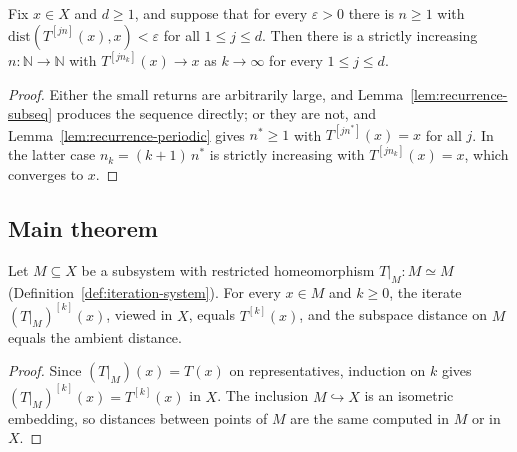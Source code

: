 \begin{lemma}
    \label{lem:recurrence-sequential}
    \leanok
    Fix $x \in X$ and $d \ge 1$, and suppose that for every $\varepsilon > 0$
    there is $n \ge 1$ with $\mathrm{dist}(T^{[j n]}(x), x) < \varepsilon$ for all
    $1 \le j \le d$. Then there is a strictly increasing
    $n : \mathbb{N} \to \mathbb{N}$ with $T^{[j n_k]}(x) \to x$ as $k \to \infty$
    for every $1 \le j \le d$.
\end{lemma}
\begin{proof}
    Either the small returns are arbitrarily large, and
    Lemma~\ref{lem:recurrence-subseq} produces the sequence directly; or they are
    not, and Lemma~\ref{lem:recurrence-periodic} gives $n^\ast \ge 1$ with
    $T^{[j n^\ast]}(x) = x$ for all $j$. In the latter case
    $n_k = (k+1)\, n^\ast$ is strictly increasing with $T^{[j n_k]}(x) = x$,
    which converges to $x$.
\end{proof}

\subsection{Main theorem}

\begin{lemma}
    \label{lem:restricted-iterate-agreement}
    \leanok
    Let $M \subseteq X$ be a subsystem with restricted homeomorphism
    $T|_M : M \simeq M$ (Definition~\ref{def:iteration-system}). For every
    $x \in M$ and $k \ge 0$, the iterate $(T|_M)^{[k]}(x)$, viewed in $X$, equals
    $T^{[k]}(x)$, and the subspace distance on $M$ equals the ambient distance.
\end{lemma}
\begin{proof}
    Since $(T|_M)(x) = T(x)$ on representatives, induction on $k$ gives
    $(T|_M)^{[k]}(x) = T^{[k]}(x)$ in $X$. The inclusion $M \hookrightarrow X$ is
    an isometric embedding, so distances between points of $M$ are the same
    computed in $M$ or in $X$.
\end{proof}

